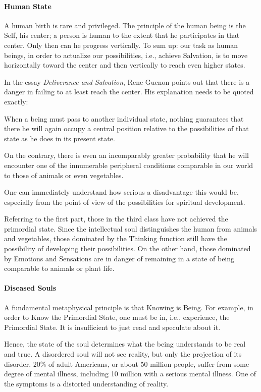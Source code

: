 \paragraph{Human State}
A human birth is rare and privileged. The principle of the human being is the Self, his center; a person is human to the extent that he participates in that center. Only then can he progress vertically. To sum up: our task as human beings, in order to actualize our possibilities, i.e., achieve Salvation, is to move horizontally toward the center and then vertically to reach even higher states.

In the essay \emph{Deliverance and Salvation}, Rene Guenon points out that there is a danger in failing to at least reach the center. His explanation needs to be quoted exactly:

\begin{quotex}
When a being must pass to another individual state, nothing guarantees that there he will again occupy a central position relative to the possibilities of that state as he does in its present state.

On the contrary, there is even an incomparably greater probability that he will encounter one of the innumerable peripheral conditions comparable in our world to those of animals or even vegetables.

One can immediately understand how serious a disadvantage this would be, especially from the point of view of the possibilities for spiritual development. 

\end{quotex}
Referring to the first part, those in the third class have not achieved the primordial state. Since the intellectual soul distinguishes the human from animals and vegetables, those dominated by the Thinking function still have the possibility of developing their possibilities. On the other hand, those dominated by Emotions and Sensations are in danger of remaining in a state of being comparable to animals or plant life.

\paragraph{Diseased Souls}
A fundamental metaphysical principle is that Knowing is Being. For example, in order to Know the Primordial State, one must be in, i.e., experience, the Primordial State. It is insufficient to just read and speculate about it.

Hence, the state of the soul determines what the being understands to be real and true. A disordered soul will not see reality, but only the projection of its disorder. 20\% of adult Americans, or about 50 million people, suffer from some degree of mental illness, including 10 million with a serious mental illness. One of the symptoms is a distorted understanding of reality.

